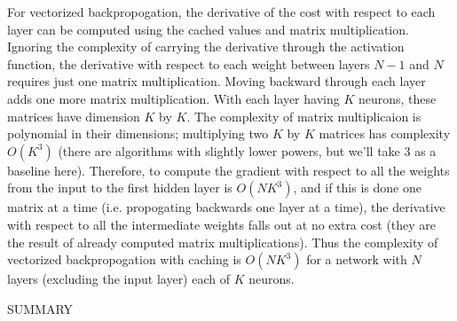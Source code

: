 \documentclass{article}
\begin{document}
   For vectorized backpropogation, the derivative of the cost with respect to each layer
   can be computed using the cached values and matrix multiplication. Ignoring the complexity
   of carrying the derivative through the activation function, the derivative with respect to
   each weight between layers $N-1$ and $N$ requires just one matrix multiplication.
   Moving backward through each layer adds one more matrix multiplication.
   With each layer having $K$ neurons, these matrices have dimension $K$ by $K$.
   The complexity of matrix multiplicaion is polynomial in their dimensions; multiplying two
   $K$ by $K$ matrices has complexity $O(K^3)$ (there are algorithms with slightly lower powers,
   but we'll take $3$ as a baseline here). Therefore, to compute the gradient with respect to all
   the weights from the input to the first hidden layer is $O(N K^3)$, and if this is done
   one matrix at a time (i.e. propogating backwards one layer at a time), the derivative
   with respect to all the intermediate weights falls out at no extra cost (they are the
   result of already computed matrix multiplications).
   Thus the complexity of vectorized backpropogation with caching is $O(N K^3)$ for a
   network with $N$ layers (excluding the input layer) each of $K$ neurons.

   SUMMARY
\end{document}
